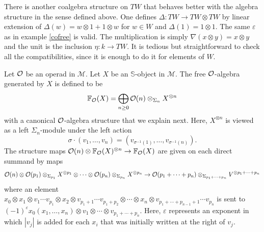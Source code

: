 \documentclass[TFM.tex]{subfiles}
\begin{document}
\begin{ex}
There is another coalgebra structure on $TW$ that behaves better with the algebra structure in the sense defined above. One defines $\Delta:TW\to TW\otimes TW$ by linear extension of $\Delta(w)=w\otimes 1+1\otimes w$ for $w\in W$ and $\Delta(1)=1\otimes 1$. The same $\varepsilon$ as in example \ref{cofree} is valid. The multiplication is simply $\nabla(x\otimes y)=x\otimes y$ and the unit is the inclusion $\eta:k\to TW$. It is tedious but straightforward to check all the compatibilities, since it is enough to do it for elements of $W$. 
\end{ex}





%
%


\begin{defi}
Let ${\mathcal O}$ be an operad in $\mathscr{M}$. Let $X$ be an $\mathbb{S}$-object in $\mathscr{M}$. The free ${\mathcal O}$-algebra generated by $X$ is defined to be
\[
\mathbb{F}_{\mathcal O}(X)=\bigoplus_{n\geq 0}{\mathcal O}(n)\otimes_{\Sigma_n}X^{\otimes n}
\]
with a canonical ${\mathcal O}$-algebra structure that we explain next. Here, $X^{\otimes n}$ is viewed as a left $\Sigma_n$-module under the left action 
\[
\sigma\cdot(v_1,\dots, v_n)=(v_{\sigma^{-1}(1)},\dots,v_{\sigma^{-1}(n)}).
\]
The structure maps ${\mathcal O}(n)\otimes\mathbb{F}_{\mathcal O}(X)^{\otimes n}\to \mathbb{F}_{\mathcal O}(X)$ are given on each direct summand  by maps
\[
{\mathcal O}(n)\otimes{\mathcal O}(p_1)\otimes_{\Sigma_{p_1}} X^{\otimes p_1}\otimes\cdots\otimes {\mathcal O}(p_n)\otimes_{\Sigma_{p_n}} X^{\otimes p_n}\to {\mathcal O}(p_1+\cdots+p_n)\otimes_{\Sigma_{p_1+\cdots+p_n}}V^{\otimes p_1+\cdots+p_n}
\]
where an element $x_0\otimes x_1\otimes v_1\cdots v_{p_1}\otimes x_2\otimes v_{p_1+1}\cdots v_{p_1+p_2}\otimes \cdots\otimes x_n\otimes v_{p_1+\cdots+p_{n-1}+1}\cdots v_{p_n}$ is sent to $(-1)^{\varepsilon} x_0(x_1,\dots, x_n)\otimes v_1\otimes\cdots\otimes v_{p_1+\cdots+p_n}$. Here, $\varepsilon$ represents an exponent in which $|v_j|$ is added for each $x_i$ that was initially written at the right of $v_j$. 

\end{defi} 
\end{document}
